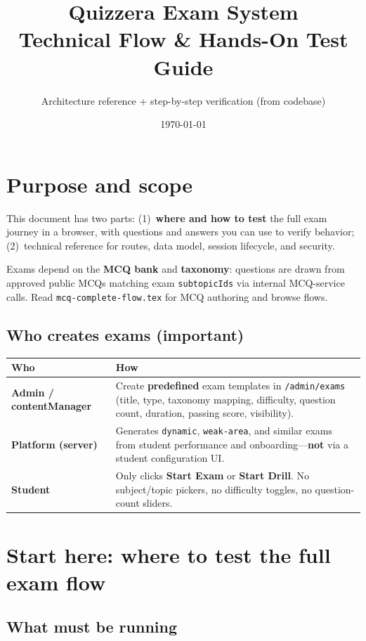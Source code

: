 \documentclass[11pt,a4paper]{article}
\title{Quizzera Exam System\\Technical Flow \& Hands-On Test Guide}
\author{Architecture reference + step-by-step verification (from codebase)}
\date{\today}
\begin{document}
\maketitle
\tableofcontents
\newpage

\section{Purpose and scope}

This document has two parts: (1)~\textbf{where and how to test} the full exam journey in a browser, with questions and answers you can use to verify behavior; (2)~technical reference for routes, data model, session lifecycle, and security.

Exams depend on the \textbf{MCQ bank} and \textbf{taxonomy}: questions are drawn from approved public MCQs matching exam \texttt{subtopicIds} via internal MCQ-service calls. Read \texttt{mcq-complete-flow.tex} for MCQ authoring and browse flows.

\subsection{Who creates exams (important)}

\begin{center}
\begin{tabular}{@{}ll@{}}
\toprule
\textbf{Who} & \textbf{How} \\
\midrule
\textbf{Admin / contentManager} & Create \textbf{predefined} exam templates in \texttt{/admin/exams} (title, type, taxonomy mapping, difficulty, question count, duration, passing score, visibility). \\
\textbf{Platform (server)} & Generates \texttt{dynamic}, \texttt{weak-area}, and similar exams from student performance and onboarding---\textbf{not} via a student configuration UI. \\
\textbf{Student} & Only clicks \textbf{Start Exam} or \textbf{Start Drill}. No subject/topic pickers, no difficulty toggles, no question-count sliders. \\
\bottomrule
\end{tabular}
\end{center}

\section{Start here: where to test the full exam flow}

\subsection{What must be running}
\end{document}
